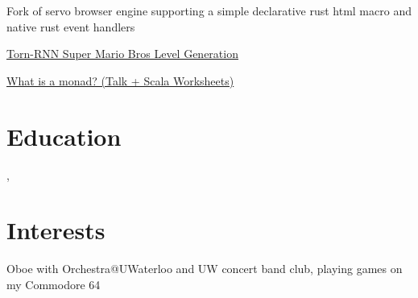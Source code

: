 \documentclass[12pt]{jmichaud-resume}
\begin{document}
\hfill
\begin{minipage}[t]{0.49\textwidth}
	
	 \hfill
	\begin{tightemize}
		\item Fork of servo browser engine supporting a simple declarative rust html macro and native rust event handlers
	\end{tightemize}
	\sectionsep
	
\end{minipage} 
\hfill
\begin{minipage}[t]{0.49\textwidth}
	
	 \hfill
	\begin{tightemize}
		\item\href{https://medium.com/@justin_michaud/super-mario-bros-level-generation-using-torch-rnn-726ddea7e9b7}{Torn-RNN Super Mario Bros Level Generation}
		\item\href{https://github.com/justinmichaud/scala-monad-worksheets/}{What is a monad? (Talk + Scala Worksheets)}
	\end{tightemize}
	\sectionsep
\end{minipage}

\section{Education} 
,  \hfill {}

\section{Interests}
Oboe with Orchestra@UWaterloo and UW concert band club, playing games on my Commodore 64\\
\end{document}
